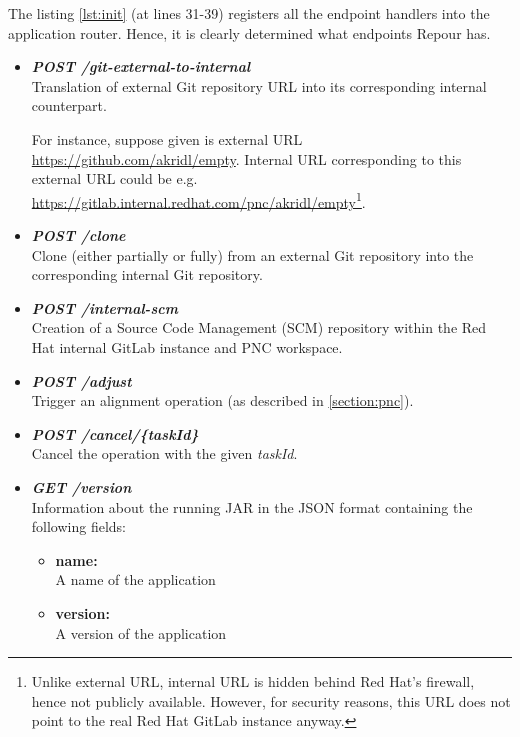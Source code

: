 \documentclass[../main.tex]{subfiles}
\begin{document}
The listing \ref{lst:init} (at lines 31-39) registers all the endpoint handlers into the application router. Hence, it is clearly determined what endpoints Repour has.

\begin{itemize}
    \item \textbf{\textit{POST /git-external-to-internal}}\\
    Translation of external Git repository URL into its corresponding internal counterpart.

    For instance, suppose given is external URL \url{https://github.com/akridl/empty}. Internal URL corresponding to this external URL could be e.g. \url{https://gitlab.internal.redhat.com/pnc/akridl/empty}\footnote{Unlike external URL, internal URL is hidden behind Red Hat's firewall, hence not publicly available. However, for security reasons, this URL does not point to the real Red Hat GitLab instance anyway.}.

    \item \textbf{\textit{POST /clone}}\\
    Clone (either partially or fully) from an external Git repository into the corresponding internal Git repository.
    
    \item \textbf{\textit{POST /internal-scm}}\\
    Creation of a Source Code Management (SCM) repository within the Red Hat internal GitLab instance and PNC workspace.

    \item \textbf{\textit{POST /adjust}}\\
    Trigger an alignment operation (as described in \ref{section:pnc}).

    \item \textbf{\textit{POST /cancel/\{taskId\}}}\\
    Cancel the operation with the given \textit{taskId}.
    
    \item \textbf{\textit{GET /version}}\\
    Information about the running JAR in the JSON format containing the following fields:
    \begin{itemize}
        \item \textbf{name:}\\
        A name of the application

        \item \textbf{version:}\\
        A version of the application


\end{itemize}
\end{itemize}
\end{document}
